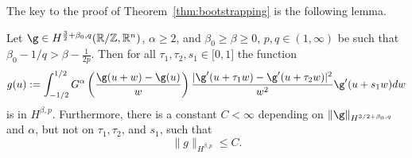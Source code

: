 The key to the proof of Theorem~\ref{thm:bootstrapping} is the following lemma.

\begin{lemma} \label{lem:basicEstimate}
Let $\g \in H^{\frac 3 2 + \beta_0,q} (\mathbb R / \mathbb Z, \mathbb R^n)$,
$\alpha\ge2$,
and $\beta_0 \ge \beta \ge 0$, $p,q \in (1, \infty)$ be such that 
$\beta_0 - 1/q > \beta - \frac 1 {2p}$.
Then for all $\tau_1, \tau_2, s_1\in \mathbb [0,1]$ the function
\begin{gather*}
g(u):= \int_{-1/2}^{1/2} G^{\alpha}\left(\frac {\g(u+w) - \g(u)}{w} \right) \frac{|\g'(u+\tau_1 w) - \g'(u+\tau_2 w)|^2}{w^2} \g'(u+s_1 w)
dw 
\end{gather*}
is in $H^{\beta,p}$. Furthermore, there is a constant $C<\infty$ depending on
$\|\g\|_{H^{3/2 + \beta_0 ,q}}$ and $\alpha$, but not on $\tau_1, \tau_2$, and $s_1$, such that
\begin{equation*}
 \|g\|_{H^{\beta,p}} \leq C.
\end{equation*}
\end{lemma}

